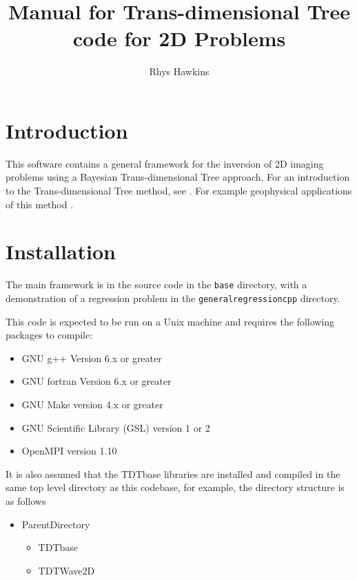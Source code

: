 \documentclass[a4paper,12pt]{article}
\begin{document}
\title{Manual for Trans-dimensional Tree code for 2D Problems}
\author{Rhys Hawkins}

\maketitle

\tableofcontents

\section{Introduction}

This software contains a general framework for the inversion of 2D imaging
problems using a Bayesian Trans-dimensional Tree approach. For an
introduction to the Trans-dimensional Tree method, see \citet{Hawkins:2015:A}.
For example geophysical applications of this method \citep{Dettmer:2016:A,Hawkins:2017:A}.

\section{Installation}

The main framework is in the source code in the {\tt base} directory, with a
demonstration of a regression problem in the {\tt generalregressioncpp} directory.

This code is expected to be run on a Unix machine and requires the
following packages to compile:

\begin{itemize}
\item GNU g++ Version 6.x or greater
\item GNU fortran Version 6.x or greater
\item GNU Make version 4.x or greater
\item GNU Scientific Library (GSL) version 1 or 2
\item OpenMPI version 1.10
\end{itemize}

It is also assumed that the TDTbase libraries are installed and
compiled in the same top level directory as this codebase, for
example, the directory structure is as follows

\begin{itemize}
\item ParentDirectory
  \begin{itemize}
  \item TDTbase
  \item TDTWave2D
  \end{itemize}
\end{itemize}
\end{document}
